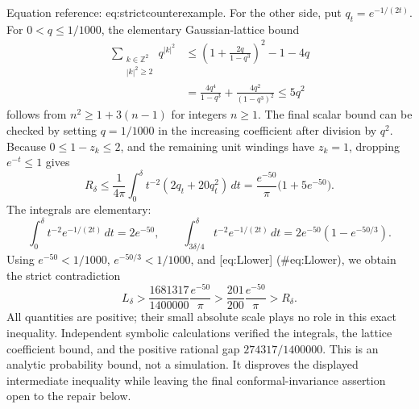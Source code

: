 \documentclass[10pt]{article}
\begin{document}
Equation reference: eq:strictcounterexample. For the other side, put \(q_t=e^{-1/(2t)}\). For \(0<q\leq1/1000\), the elementary Gaussian-lattice bound \[\begin{aligned}
 \sum_{\substack{k\in\mathbb Z^2\\|k|^2\geq2}}q^{|k|^2}
 &\leq \left(1+\frac{2q}{1-q^3}\right)^2-1-4q\\
 &=\frac{4q^4}{1-q^3}+\frac{4q^2}{(1-q^3)^2}
 \leq5q^2\end{aligned}\] follows from \(n^2\geq1+3(n-1)\) for integers \(n\geq1\). The final scalar bound can be checked by setting \(q=1/1000\) in the increasing coefficient after division by \(q^2\). Because \(0\leq1-z_k\leq2\), and the remaining unit windings have \(z_k=1\), dropping \(e^{-t}\leq1\) gives \[R_\delta\leq\frac1{4\pi}\int_0^\delta
 t^{-2}(2q_t+20q_t^2)\,dt
 =\frac{e^{-50}}{\pi}\bigl(1+5e^{-50}\bigr).\] The integrals are elementary: \[\int_0^\delta t^{-2}e^{-1/(2t)}\,dt=2e^{-50},
 \qquad
 \int_{3\delta/4}^{\delta}t^{-2}e^{-1/(2t)}\,dt
 =2e^{-50}(1-e^{-50/3}).\] Using \(e^{-50}<1/1000\), \(e^{-50/3}<1/1000\), and [eq:Llower] (\#eq:Llower), we obtain the strict contradiction \[
 L_\delta>
 \frac{1681317}{1400000}\frac{e^{-50}}{\pi}
 >
 \frac{201}{200}\frac{e^{-50}}{\pi}
 > R_\delta.\] All quantities are positive; their small absolute scale plays no role in this exact inequality. Independent symbolic calculations verified the integrals, the lattice coefficient bound, and the positive rational gap \(274317/1400000\). This is an analytic probability bound, not a simulation. It disproves the displayed intermediate inequality while leaving the final conformal-invariance assertion open to the repair below.\par
\end{document}
